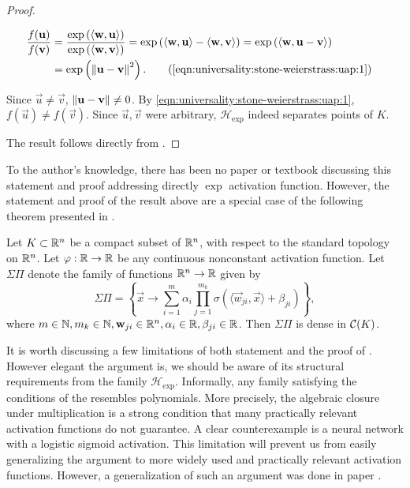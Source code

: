 \begin{proof}
\begin{step}
\begin{subequations}\label{eqn:universality:stone-weierstrass:uap:1}
\begin{align*}
    \frac{f(\vec{u}) }{f(\vec{v}) } &= \frac{ \exp \left ( {\langle \vec{w}, \vec{u} \rangle } \right)}{ \exp \left ( {\langle \vec{w}, \vec{v} \rangle } \right)} =  \exp \left ( {\langle \vec{w}, \vec{u} \rangle } - {\langle \vec{w}, \vec{v} \rangle }  \right) = \exp \left( {\langle \vec{w}, \vec{u} - \vec{v} \rangle }  \right) &\\
        &=  \exp \left( \norm{\vec{u} - \vec{v}}^2 \right).
     \tag{\ref{eqn:universality:stone-weierstrass:uap:1}} 
\end{align*}
\end{subequations}

Since $\vec{u} \neq \vec{v}$, $\left\lVert\mathbf{u} - \mathbf{v}\right\rVert \neq 0$. By \ref{eqn:universality:stone-weierstrass:uap:1}, $f(\vec{u}) \neq f(\vec{v})$. Since $\vec{u}, \vec{v}$ were arbitrary, $\mathcal{H}_{\exp}$ indeed separates points of $K$.
\end{step}
The result follows directly from .
\end{proof}

\begin{remark}
To the author's knowledge, there has been no paper or textbook discussing this statement and proof addressing directly $\exp$ activation function. However, the statement and proof of the result above are a special case of the following theorem presented in \cite{hornik}. 
\pagebreak
\begin{theorem*}
Let $K \subset {\mathbb R}^n$ be a compact subset of ${\mathbb R}^n$, with respect to the standard topology on ${\mathbb R}^n$. Let $\varphi : {\mathbb R} \to {\mathbb R}$ be any continuous nonconstant activation function. Let $\Sigma\Pi$ denote the family of functions ${\mathbb R}^n \to {\mathbb R}$ given by \[ 
 \Sigma\Pi = \left \{ \vec{x} \to  \sum_{i=1}^m \alpha_i \prod_{j = 1}^{m_k} \sigma (\langle \vec{w}_{ji}, \vec{x}  \rangle + \beta_{ji} )  \right\},
\]
where $m \in {\mathbb N}, m_k \in {\mathbb N}, \mathbf{w}_{ji} \in {\mathbb R}^n, \alpha_i \in {\mathbb R}, \beta_{ji} \in {\mathbb R}$. Then $\Sigma\Pi$ is dense in ${\mathcal C}(K)$.
\end{theorem*}
\end{remark}

It is worth discussing a few limitations of both statement and the proof of . However elegant the argument is, we should be aware of its structural requirements from the family $\mathcal{H}_{\exp}$. Informally, any family satisfying the conditions of the  resembles polynomials. More precisely, the algebraic closure under multiplication is a strong condition that many practically relevant activation functions do not guarantee. A clear counterexample is a neural network with a logistic sigmoid activation. This limitation will prevent us from easily generalizing the argument to more widely used and practically relevant activation functions.
However, a generalization of such an argument was done in paper \cite{hornik}.

